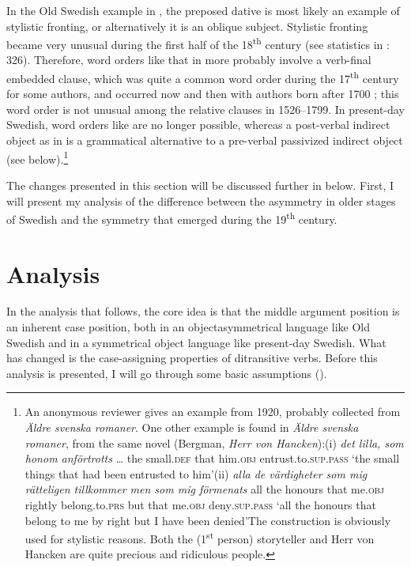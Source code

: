 \documentclass[output=paper]{langscibook}
\begin{document}
In the Old Swedish example in , the preposed dative is most likely an example of stylistic fronting, or alternatively it is an oblique subject. Stylistic fronting became very unusual during the first half of the 18\textsuperscript{th} century (see statistics in \citealt{Falk1993}: 326). Therefore, word orders like that in  more probably involve a verb-final embedded clause, which was quite a common word order during the 17\textsuperscript{th} century for some authors, and occurred now and then with authors born after 1700 \citep{Platzack1983}; this word order is not unusual among the relative clauses in 1526–1799. In present-day Swedish, word orders like  are no longer possible, whereas a post-verbal indirect object as in  is a grammatical alternative to a pre-verbal passivized indirect object (see  below).\footnote{An anonymous reviewer gives an example from 1920, probably collected from \textit{Äldre svenska romaner}. One other example is found in \textit{Äldre svenska romaner}, from the same novel (Bergman, \textit{Herr von Hancken}):(i)  \textit{det  lilla,    som  honom    anförtrotts} …   the  small.\textsc{def}  that  him.\textsc{obj}  entrust.to.\textsc{sup.pass}  ‘the small things that had been entrusted to him’(ii)  \textit{alla de  värdigheter  som  mig    rätteligen  tillkommer    men  som  mig    förmenats}  all the  honours    that  me.\textsc{obj}  rightly    belong.to.\textsc{prs}  but  that  me.\textsc{obj}  deny\textsc{.sup.pass}  ‘all the honours that belong to me by right but I have been denied’The construction is obviously used for stylistic reasons. Both the (1\textsuperscript{st} person) storyteller and Herr von Hancken are quite precious and ridiculous people.}


The changes presented in this section will be discussed further in  below. First, I will present my analysis of the difference between the asymmetry in older stages of Swedish and the symmetry that emerged during the 19\textsuperscript{th} century.

\section{Analysis}\label{sec:falk:4}


In the analysis that follows, the core idea is that the middle argument position is an inherent case position, both in an objectasymmetrical language like Old Swedish and in a symmetrical object language like present-day Swedish. What has changed is the case-assigning properties of ditransitive verbs. Before this analysis is presented, I will go through some basic assumptions ().
\end{document}
